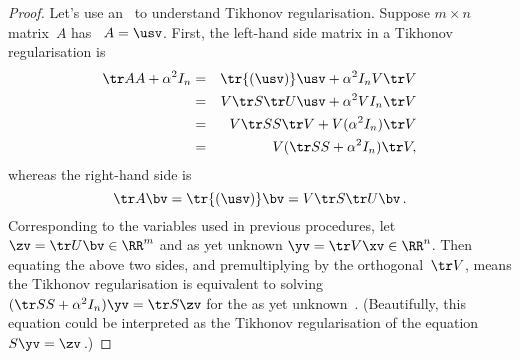 \begin{proof} 
Let's use an \svd\ to understand Tikhonov regularisation.
Suppose \(m\times n\) matrix~\(A\) has \svd\ \(A=\usv\).
First, the left-hand side matrix in a Tikhonov regularisation is
\begin{eqnarray*}
\tr AA+\alpha^2I_n
&=&\tr{(\usv)}\usv+\alpha^2I_nV\tr V
\\&=&V\tr S\tr U\usv+\alpha^2VI_n\tr V
\\&=&V\tr SS\tr V+V(\alpha^2I_n)\tr V
\\&=&V(\tr SS+\alpha^2I_n)\tr V,
\end{eqnarray*}
whereas the right-hand side is 
\begin{equation*}
\tr A\bv =\tr{(\usv)}\bv =V\tr S\tr U\bv\,.
\end{equation*}
Corresponding to the variables used in previous procedures, let \(\zv=\tr U\bv\in\RR^m\) and as yet unknown \(\yv=\tr V\xv\in\RR^n\). 
Then equating the above two sides, and premultiplying by the orthogonal~\(\tr V\), means the Tikhonov regularisation is equivalent to solving \((\tr SS+\alpha^2I_n)\yv=\tr S\zv\) for the as yet unknown~\yv.
(Beautifully, this equation could be interpreted as the Tikhonov regularisation of the equation \(S\yv=\zv\)\,.)


\end{proof}
